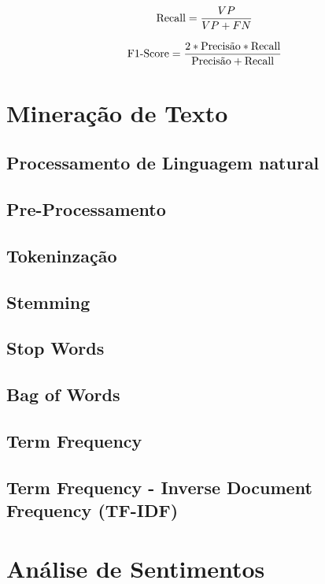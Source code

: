           \begin{equation}\label{recall}
            \begin{aligned}
              \textup{Recall} = \frac{VP}{VP+FN}
          \end{aligned} 
          \end{equation}


          \begin{equation}\label{f1score}
            \begin{aligned}
              \textup{F$1$-Score} = \frac{2*\textup{Precisão}*\textup{Recall}}{\textup{Precisão}+\textup{Recall}}
          \end{aligned} 
          \end{equation}

\section{Mineração de Texto}
  \subsection{Processamento de Linguagem natural}
  \subsection{Pre-Processamento}
  \subsection{Tokeninzação}
  \subsection{Stemming}
  \subsection{Stop Words}
  \subsection{Bag of Words}
  \subsection{Term Frequency}
  \subsection{Term Frequency - Inverse Document Frequency (TF-IDF)}

\section{Análise de Sentimentos}

